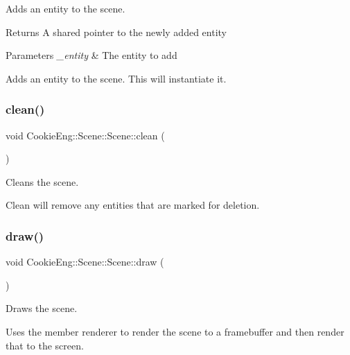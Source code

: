 Adds an entity to the scene. 

\begin{DoxyReturn}{Returns}
A shared pointer to the newly added entity 
\end{DoxyReturn}

\begin{DoxyParams}{Parameters}
{\em \+\_\+entity} & The entity to add\\
\hline
\end{DoxyParams}
Adds an entity to the scene. This will instantiate it. \mbox{\label{class_cookie_eng_1_1_scene_1_1_scene_a3e1fa17bfd8e0e3af72db05c7a5ae0b3}} 
\subsubsection{\texorpdfstring{clean()}{clean()}}
{\footnotesize\ttfamily void Cookie\+Eng\+::\+Scene\+::\+Scene\+::clean (\begin{DoxyParamCaption}{ }\end{DoxyParamCaption})}



Cleans the scene. 

Clean will remove any entities that are marked for deletion. \mbox{\label{class_cookie_eng_1_1_scene_1_1_scene_a94dbc42f8c5b2f7774d8e0de1f5e45a7}} 
\subsubsection{\texorpdfstring{draw()}{draw()}}
{\footnotesize\ttfamily void Cookie\+Eng\+::\+Scene\+::\+Scene\+::draw (\begin{DoxyParamCaption}{ }\end{DoxyParamCaption})}



Draws the scene. 

Uses the member renderer to render the scene to a framebuffer and then render that to the screen. \mbox{\label{class_cookie_eng_1_1_scene_1_1_scene_a4287243abfe6016c8c819aebc090bf4c}} 

